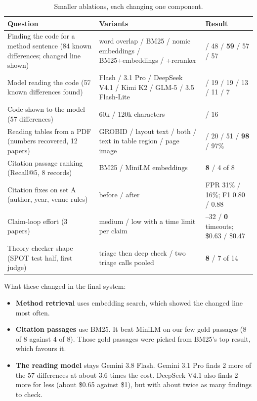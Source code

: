 \documentclass[11pt,a4paper]{article}
\begin{document}
\begin{table}[h]
\centering\small
\caption{Smaller ablations, each changing one component.}
\label{tab:abl}
\begin{tabularx}{\textwidth}{@{}>{\raggedright\arraybackslash}X>{\raggedright\arraybackslash}X>{\raggedright\arraybackslash}p{4.2cm}@{}}
\toprule
Question & Variants & Result \\
\midrule
Finding the code for a method sentence (84 known differences; changed line shown) & word overlap / BM25 / nomic embeddings / BM25+embeddings / +reranker & 35 / 48 / \textbf{59} / 57 / 57 \\
Model reading the code (57 known differences found) & 3.8 Flash / 3.1 Pro / DeepSeek V4.1 / Kimi K2 / GLM-5 / 3.5 Flash-Lite & 17 / 19 / 19 / 13 / 11 / 7 \\
Code shown to the model (57 differences) & 60k / 120k characters & 17 / 16 \\
Reading tables from a PDF (numbers recovered, 12 papers) & GROBID / layout text / both / text in table region / page image & 41 / 20 / 51 / \textbf{98} / 97\% \\
Citation passage ranking (Recall@5, 8 records) & BM25 / MiniLM embeddings & \textbf{8} / 4 of 8 \\
Citation fixes on set A (author, year, venue rules) & before / after & FPR 31\% / 16\%; F1 0.80 / 0.88 \\
Claim-loop effort (3 papers) & medium / low with a time limit per claim & 17--32 / \textbf{0} timeouts; \$0.63 / \$0.47 \\
Theory checker shape (SPOT test half, first judge) & triage then deep check / two triage calls pooled & \textbf{8} / 7 of 14 \\
\bottomrule
\end{tabularx}
\end{table}

What these changed in the final system:
\begin{itemize}
\item \textbf{Method retrieval} uses embedding search, which showed the changed line most often.
\item \textbf{Citation passages} use BM25. It beat MiniLM on our few gold passages (8 of 8 against
4 of 8). Those gold passages were picked from BM25's top result, which favours it.
\item \textbf{The reading model} stays Gemini 3.8 Flash. Gemini 3.1 Pro finds 2 more of the 57
differences at about 3.6 times the cost. DeepSeek V4.1 also finds 2 more for less (about \$0.65
against \$1), but with about twice as many findings to check.
\end{itemize}
\end{document}
